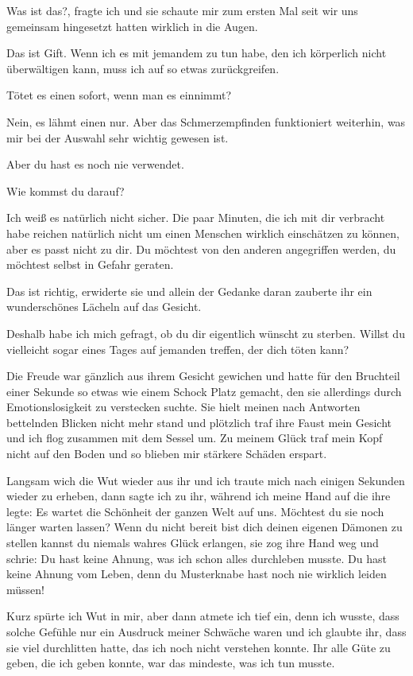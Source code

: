 \documentclass[11pt, a5paper]{article}
\newcommand{\sdw}{Es wartet die Schönheit der ganzen Welt auf uns. Möchtest du sie noch länger warten lassen? }
\begin{document}
\begin{spacing}{1.2}
		\frqq Was ist das?\flqq , fragte ich und sie schaute mir zum ersten Mal seit wir uns gemeinsam hingesetzt hatten wirklich in die Augen.
		
		\frqq Das ist Gift. Wenn ich es mit jemandem zu tun habe, den ich körperlich nicht überwältigen kann, muss ich auf so etwas zurückgreifen.\flqq
		
		\frqq Tötet es einen sofort, wenn man es einnimmt?\flqq
		
		\frqq Nein, es lähmt einen nur. Aber das Schmerzempfinden funktioniert weiterhin, was mir bei der Auswahl sehr wichtig gewesen ist.\flqq
		
		\frqq Aber du hast es noch nie verwendet.\flqq
		
		\frqq Wie kommst du darauf?\flqq
		
		\frqq Ich weiß es natürlich nicht sicher. Die paar Minuten, die ich mit dir verbracht habe reichen natürlich nicht um einen Menschen wirklich einschätzen zu können, aber es passt nicht zu dir. Du möchtest von den anderen angegriffen werden, du möchtest selbst in Gefahr geraten.\flqq
		
		\frqq Das ist richtig\flqq , erwiderte sie und allein der Gedanke daran zauberte ihr ein wunderschönes Lächeln auf das Gesicht.
		
		\frqq Deshalb habe ich mich gefragt, ob du dir eigentlich wünscht zu sterben. Willst du vielleicht sogar eines Tages auf jemanden treffen, der dich töten kann?\flqq
		
		Die Freude war gänzlich aus ihrem Gesicht gewichen und hatte für den Bruchteil einer Sekunde so etwas wie einem Schock Platz gemacht, den sie allerdings durch Emotionslosigkeit zu verstecken suchte. Sie hielt meinen nach Antworten bettelnden Blicken nicht mehr stand und plötzlich traf ihre Faust mein Gesicht und ich flog zusammen mit dem Sessel um. Zu meinem Glück traf mein Kopf nicht auf den Boden und so blieben mir stärkere Schäden erspart.
		
		Langsam wich die Wut wieder aus ihr und ich traute mich nach einigen Sekunden wieder zu erheben, dann sagte ich zu ihr, während ich meine Hand auf die ihre legte: \frqq \sdw Wenn du nicht bereit bist dich deinen eigenen Dämonen zu stellen kannst du niemals wahres Glück erlangen\flqq , sie zog ihre Hand weg und schrie: \frqq Du hast keine Ahnung, was ich schon alles durchleben musste. Du hast keine Ahnung vom Leben, denn du Musterknabe hast noch nie wirklich leiden müssen!\flqq
		
		Kurz spürte ich Wut in mir, aber dann atmete ich tief ein, denn ich wusste, dass solche Gefühle nur ein Ausdruck meiner Schwäche waren und ich glaubte ihr, dass sie viel durchlitten hatte, das ich noch nicht verstehen konnte. Ihr alle Güte zu geben, die ich geben konnte, war das mindeste, was ich tun musste.
		

\end{spacing}
\end{document}
